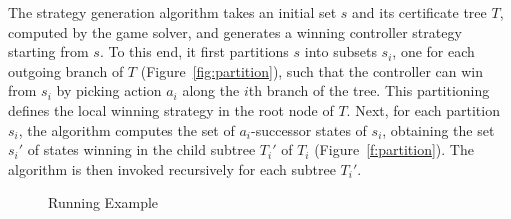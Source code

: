 The strategy generation algorithm takes an initial set $s$ and its certificate tree $T$, computed by the game solver, and generates a winning controller strategy starting from $s$.  To this end, it first partitions $s$ into subsets $s_i$, one for each outgoing branch of $T$ (Figure~\ref{fig:partition}), such that the controller can win from $s_i$ by picking action $a_i$ along the $i$th branch of the tree.  This partitioning defines the local winning strategy in the root node of $T$.  Next, for each partition $s_i$, the algorithm computes the set of $a_i$-successor states of $s_i$, obtaining the set $s_i'$ of states winning in the child subtree $T_i'$ of $T_i$ (Figure~\ref{f:partition}).  The algorithm is then invoked recursively for each subtree $T_i'$.


\begin{figure}
    \caption{Running Example}
    \label{fig:stratExample}
\end{figure}

